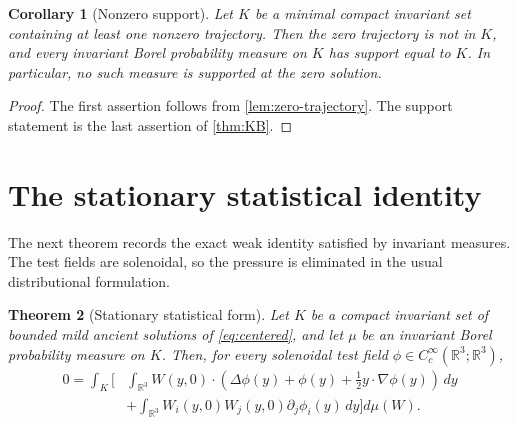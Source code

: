 \documentclass[11pt]{amsart}
\theoremstyle{plain}
\newtheorem{theorem}{Theorem}[section]
\newtheorem{corollary}[theorem]{Corollary}
\theoremstyle{definition}
\theoremstyle{remark}
\numberwithin{equation}{section}
\begin{document}
\begin{corollary}[Nonzero support]\label{cor:nonzero-support}
Let \(K\) be a minimal compact invariant set containing at least one nonzero
trajectory.  Then the zero trajectory is not in \(K\), and every invariant
Borel probability measure on \(K\) has support equal to \(K\).  In particular,
no such measure is supported at the zero solution.
\end{corollary}

\begin{proof}
The first assertion follows from \cref{lem:zero-trajectory}.  The support
statement is the last assertion of \cref{thm:KB}.
\end{proof}

\section{The stationary statistical identity}

The next theorem records the exact weak identity satisfied by invariant
measures.  The test fields are solenoidal, so the pressure is eliminated in
the usual distributional formulation.

\begin{theorem}[Stationary statistical form]\label{thm:statistical-identity}
Let \(K\) be a compact invariant set of bounded mild ancient solutions of
\eqref{eq:centered}, and let \(\mu\) be an invariant Borel probability measure
on \(K\).  Then, for every solenoidal test field
\(\phi\in C_c^\infty(\mathbb R^3;\mathbb R^3)\),
\begin{equation}\label{eq:statistical-identity}
   \begin{aligned}
   0
   =
   \int_K
   \bigg[
      &\int_{\mathbb R^3}
      W(y,0)\cdot
      \left(\Delta\phi(y)+\phi(y)+\frac12 y\cdot\nabla\phi(y)\right)\,dy \\
      &+
      \int_{\mathbb R^3}
      W_i(y,0)W_j(y,0)\partial_j\phi_i(y)\,dy
   \bigg]d\mu(W).
   \end{aligned}
\end{equation}
\end{theorem}
\end{document}
